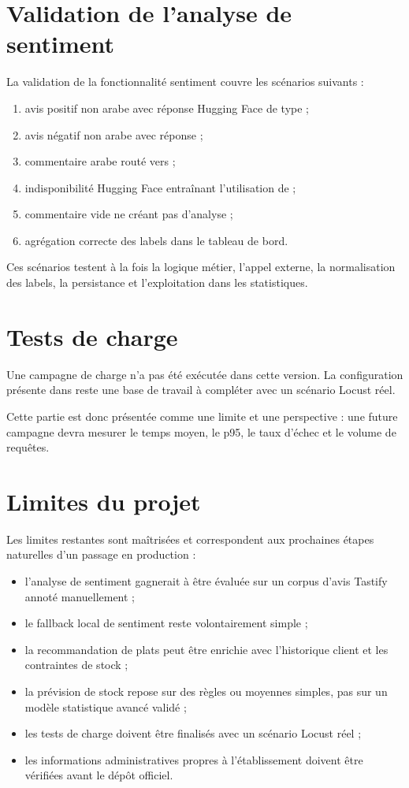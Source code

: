 \section{Validation de l'analyse de sentiment}
La validation de la fonctionnalité sentiment couvre les scénarios suivants :

\begin{enumerate}
  \item avis positif non arabe avec réponse Hugging Face de type  ;
  \item avis négatif non arabe avec réponse  ;
  \item commentaire arabe routé vers  ;
  \item indisponibilité Hugging Face entraînant l'utilisation de  ;
  \item commentaire vide ne créant pas d'analyse ;
  \item agrégation correcte des labels dans le tableau de bord.
\end{enumerate}

Ces scénarios testent à la fois la logique métier, l'appel externe, la normalisation des labels, la persistance et l'exploitation dans les statistiques.

\section{Tests de charge}
Une campagne de charge n'a pas été exécutée dans cette version. La configuration  présente dans  reste une base de travail à compléter avec un scénario Locust réel.

Cette partie est donc présentée comme une limite et une perspective : une future campagne devra mesurer le temps moyen, le p95, le taux d'échec et le volume de requêtes.

\section{Limites du projet}
Les limites restantes sont maîtrisées et correspondent aux prochaines étapes naturelles d'un passage en production :

\begin{itemize}
  \item l'analyse de sentiment gagnerait à être évaluée sur un corpus d'avis Tastify annoté manuellement ;
  \item le fallback local de sentiment reste volontairement simple ;
  \item la recommandation de plats peut être enrichie avec l'historique client et les contraintes de stock ;
  \item la prévision de stock repose sur des règles ou moyennes simples, pas sur un modèle statistique avancé validé ;
  \item les tests de charge doivent être finalisés avec un scénario Locust réel ;
  \item les informations administratives propres à l'établissement doivent être vérifiées avant le dépôt officiel.
\end{itemize}

